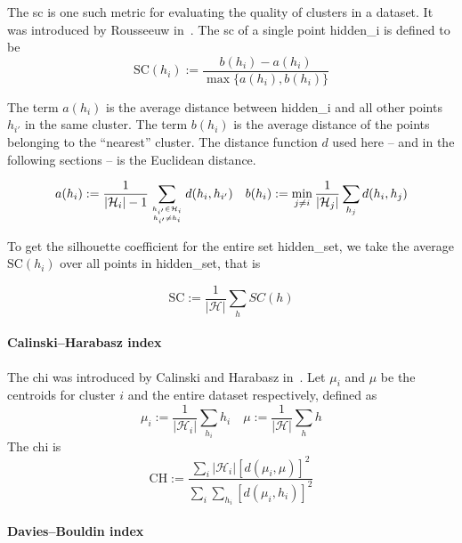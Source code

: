 The \acrfull{sc} is one such metric for evaluating the quality of clusters in a dataset. It was introduced by Rousseeuw in~\cite{SilhouettesARousse1987}.
The \acrlong{sc} of a single point \gls{hidden_i} is defined to be
\begin{equation*}
  \textrm{SC}(h_i) := \frac{b(h_i) - a(h_i)}{\max\{a(h_i), b(h_i)\}}
\end{equation*}

The term $a(h_i)$ is the average distance between \gls{hidden_i} and all other points $h_{i'}$ in the same cluster. The term $b(h_i)$ is the average distance of the points belonging to the ``nearest'' cluster. The distance function $d$ used here -- and in the following sections -- is the Euclidean distance.

\begin{equation*}
  a(h_i) := \frac{1}{|\mathcal{H}_i| - 1} \sum_{h_{i'} \in \mathcal{H}_i \atop h_{i'} \neq h_{i}} d(h_{i}, h_{i'}) \quad
  b(h_i) := \min_{j \neq i} \frac{1}{|\mathcal{H}_j|} \sum_{h_j} d(h_i, h_j)
\end{equation*}

To get the silhouette coefficient for the entire set \gls{hidden_set}, we take the average $\textrm{SC}(h_i)$ over all points in \gls{hidden_set}, that is

\begin{equation}
  \textrm{SC} := \frac{1}{|\mathcal{H}|} \sum_{h} SC(h)
  \label{eq:sc}
\end{equation}

\paragraph{Calinski–Harabasz index}
\label{par:calinski–harabasz-index}

The \acrfull{chi} was introduced by Calinski and Harabasz in~\cite{ADendriteMethCalins1974}. Let $\mu_i$ and $\mu$ be the centroids for cluster $i$ and the entire dataset respectively, defined as
\begin{equation*}
  \mu_i := \frac{1}{|\mathcal{H}_i|} \sum_{h_i} h_i \quad
  \mu := \frac{1}{|\mathcal{H}|} \sum_{h} h
\end{equation*}
The \acrlong{chi} is
\begin{equation}
\textrm{CH} := \frac
  {\sum_i |\mathcal{H}_i| {\left[d(\mu_i, \mu)\right]}^2}
  {\sum_i \sum_{h_i} {\left[d(\mu_i, h_i)\right]}^2}
  \label{eq:chi}
\end{equation}

\paragraph{Davies–Bouldin index}
\label{par:Davies–Bouldin-index}

